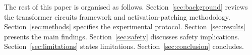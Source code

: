 The rest of this paper is organised as follows.
Section~\ref{sec:background} reviews the transformer circuits framework and
activation-patching methodology.
Section~\ref{sec:methods} specifies the experimental protocol.
Section~\ref{sec:results} presents the main findings.
Section~\ref{sec:safety} discusses safety implications.
Section~\ref{sec:limitations} states limitations.
Section~\ref{sec:conclusion} concludes.
